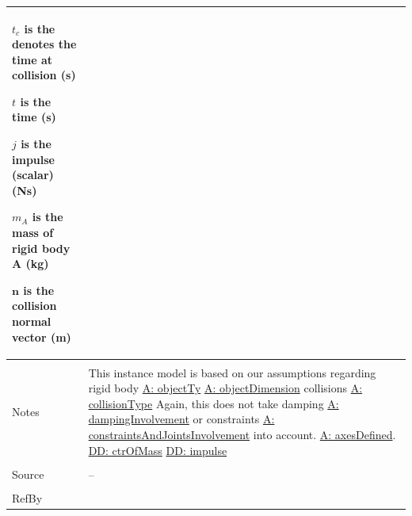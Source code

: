 \documentclass[12pt]{article}
\begin{document}
\begin{minipage}{\textwidth}
\begin{tabular}{p{} p{}}
\begin{symbDescription}
              \item{${t_{c}}$ is the denotes the time at collision (s)}
              \item{$t$ is the time (s)}
              \item{$j$ is the impulse (scalar) (Ns)}
              \item{${m_{A}}$ is the mass of rigid body A (kg)}
              \item{$\mathbf{n}$ is the collision normal vector (m)}
              \end{symbDescription}
\\ \midrule \\
Notes & This instance model is based on our assumptions regarding rigid body \hyperref[assumpOT]{A: objectTy} \hyperref[assumpOD]{A: objectDimension} collisions \hyperref[assumpCT]{A: collisionType} Again, this does not take damping \hyperref[assumpDI]{A: dampingInvolvement} or constraints \hyperref[assumpCAJI]{A: constraintsAndJointsInvolvement} into account. \hyperref[assumpAD]{A: axesDefined}. \hyperref[DD:ctrOfMass]{DD: ctrOfMass} \hyperref[DD:impulse]{DD: impulse}
\\ \midrule \\
Source & --
\\ \midrule \\
RefBy & 
\\ \bottomrule \end{tabular}
\end{minipage}
\end{document}
